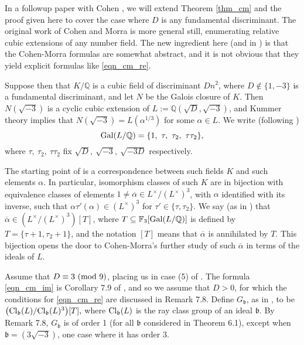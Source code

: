 \documentclass[12pt]{amsart}
\theoremstyle{remark}
\numberwithin{theorem}{section} \numberwithin{equation}{section}
\newcommand{\mfb}{\mathfrak{b}}
\newcommand{\F}{\mathbb{F}}
\newcommand{\Cl}{{\text {\rm Cl}}}
\newcommand{\Q}{\mathbb{Q}}
\newcommand{\textmod}{{\text {\rm mod}}}
\newcommand{\Gal}{{\text {\rm Gal}}}
\begin{document}
In a followup paper with Cohen \cite{CT}, we will extend Theorem \ref{thm_cm} and the proof given here to cover the case where $D$
is any fundamental discriminant. The original work of Cohen and Morra is more general still, enumerating relative cubic extensions
of any number field. The new ingredient here (and in \cite{CT}) is that the Cohen-Morra formulas are somewhat abstract, and it is not obvious that they yield
explicit formulas like \eqref{eqn_cm_re}.

Suppose then that $K/\Q$ is a cubic field of discriminant $D n^2$, where $D \not \in \{ 1, -3 \}$ is a fundamental discriminant, and 
let $N$ be the Galois closure of $K$. Then $N(\sqrt{-3})$ is a cyclic cubic extension of $L := \Q(\sqrt{D}, \sqrt{-3})$,
and Kummer theory implies that $N(\sqrt{-3}) = L(\alpha^{1/3})$ for some $\alpha \in L$. We write (following \cite[Remark 2.2]{CM})
\begin{equation}
\Gal(L/\Q) = \{1, \ \tau, \ \tau_2, \ \tau \tau_2 \},
\end{equation}
where $\tau, \ \tau_2, \ \tau \tau_2$ fix $\sqrt{D}, \ \sqrt{-3}, \ \sqrt{-3D}$ respectively.

The starting point of \cite{CM}
is a correspondence between such fields $K$ and such elements $\alpha$.
In particular, isomorphism classes of such $K$ are in bijection with equivalence classes of elements $1 \neq \overline{\alpha} \in L^{\times}/(L^{\times})^3$,
with $\alpha$ identified with its inverse,
such that $\alpha \tau'(\alpha) \in (L^{\times})^3$ for $\tau' \in \{ \tau, \tau_2 \}$. 
We say (as in \cite[Definition 2.3]{CM}) that $\overline{\alpha} \in (L^{\times}/(L^{\times})^3)[T]$, where
$T \subseteq \F_3[\Gal(L/\Q)]$ is defined by $T = \{ \tau + 1, \tau_2 + 1 \}$, and the notation $[T]$ means
that $\overline{\alpha}$ is annihilated by $T$. This bijection opens the door to Cohen-Morra's
further study of such $\overline{\alpha}$ in terms of the ideals of $L$.

Assume that $D \equiv 3 \ (\textmod \ 9)$, placing us in case (5) of \cite[p. 464]{CM}. The 
formula \eqref{eqn_cm_im} is Corollary 7.9 of \cite{CM}, and so we assume that $D > 0$, for which
the conditions for \eqref{eqn_cm_re} are discussed in
Remark 7.8. Define $G_{\mfb}$, as in \cite[Theorem 6.1]{CM}, to be
$\big(\Cl_{\mfb}(L)/\Cl_{\mfb}(L)^3\big)[T],$ where $\Cl_{\mfb}(L)$ is the ray class group of an ideal $\mfb$.
By Remark 7.8, $G_{\mfb}$ is of order 1 (for all $\mfb$ considered in Theorem 6.1), except when $\mfb = (3\sqrt{-3})$, 
one case where it has order 3. 
\end{document}
